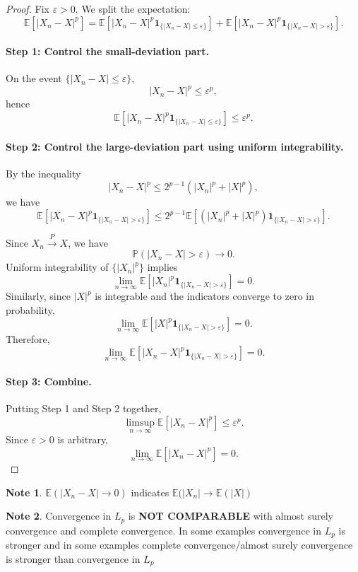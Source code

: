\documentclass[11pt]{article}
\theoremstyle{definition}
\newtheorem{note}{Note}[section]
\begin{document}
\begin{proof}
Fix $\varepsilon > 0$. We split the expectation:
\[
\mathbb{E}\!\left[ |X_n - X|^p \right]
=
\mathbb{E}\!\left[ |X_n - X|^p \mathbf{1}_{\{|X_n - X| \le \varepsilon\}} \right]
+
\mathbb{E}\!\left[ |X_n - X|^p \mathbf{1}_{\{|X_n - X| > \varepsilon\}} \right].
\]

\paragraph{Step 1: Control the small-deviation part.}
On the event $\{|X_n - X| \le \varepsilon\}$,
\[
|X_n - X|^p \le \varepsilon^p,
\]
hence
\[
\mathbb{E}\!\left[ |X_n - X|^p \mathbf{1}_{\{|X_n - X| \le \varepsilon\}} \right]
\le \varepsilon^p.
\]

\paragraph{Step 2: Control the large-deviation part using uniform integrability.}
By the inequality
\[
|X_n - X|^p \le 2^{p-1}\left(|X_n|^p + |X|^p\right),
\]
we have
\[
\mathbb{E}\!\left[ |X_n - X|^p \mathbf{1}_{\{|X_n - X| > \varepsilon\}} \right]
\le
2^{p-1}
\mathbb{E}\!\left[ \left(|X_n|^p + |X|^p\right)
\mathbf{1}_{\{|X_n - X| > \varepsilon\}} \right].
\]

Since $X_n \xrightarrow{P} X$, we have
\[
\mathbb{P}(|X_n - X| > \varepsilon) \to 0.
\]
Uniform integrability of $\{|X_n|^p\}$ implies
\[
\lim_{n\to\infty}
\mathbb{E}\!\left[ |X_n|^p \mathbf{1}_{\{|X_n - X| > \varepsilon\}} \right] = 0.
\]
Similarly, since $|X|^p$ is integrable and the indicators converge to zero in probability,
\[
\lim_{n\to\infty}
\mathbb{E}\!\left[ |X|^p \mathbf{1}_{\{|X_n - X| > \varepsilon\}} \right] = 0.
\]
Therefore,
\[
\lim_{n\to\infty}
\mathbb{E}\!\left[ |X_n - X|^p \mathbf{1}_{\{|X_n - X| > \varepsilon\}} \right] = 0.
\]

\paragraph{Step 3: Combine.}
Putting Step 1 and Step 2 together,
\[
\limsup_{n\to\infty}
\mathbb{E}\!\left[ |X_n - X|^p \right]
\le \varepsilon^p.
\]
Since $\varepsilon > 0$ is arbitrary,
\[
\lim_{n\to\infty} \mathbb{E}\!\left[ |X_n - X|^p \right] = 0.
\]
\end{proof}
\begin{note}
    $\mathbb{E}(|X_n-X|\rightarrow0)$ indicates $\mathbb{E}(|X_n|\rightarrow\mathbb{E}(|X|)$
\end{note}
\begin{note}
    Convergence in $L_p$ is \textbf{NOT COMPARABLE} with almost surely convergence and complete convergence. In some examples convergence in $L_p$ is stronger and in some examples complete convergence/almost surely convergence is stronger than convergence in $L_p$
\end{note}
\end{document}
